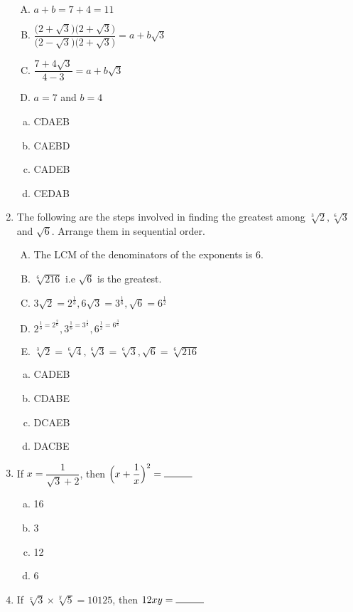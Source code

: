 \begin{multicols}{2}
\begin{enumerate}
\begin{enumerate}[(A)]
\item $a+b = 7+4 = 11$
\item $\dfrac{\Big(2+\sqrt{3}\Big)\Big(2+\sqrt{3}\Big)}{\Big(2-\sqrt{3}\Big)\Big(2+\sqrt{3}\Big)} = a+b\sqrt{3}$
\item $\dfrac{7+4\sqrt{3}}{4-3} = a+b\sqrt{3}$
\item $a =7$ and $b = 4$
\end{enumerate}
\begin{enumerate}[(a)]
\item CDAEB
\item CAEBD
\item CADEB
\item CEDAB
\end{enumerate}
\item The following are the steps involved in finding the greatest among $\sqrt[3]{2}, \sqrt[6]{3}$ and $\sqrt{6}$. Arrange them in sequential order.
\begin{enumerate}[(A)]
\item The LCM of the denominators of the exponents is 6.
\item $\sqrt[6]{216}$ i.e $\sqrt{6}$ is the greatest.
\item $3\sqrt{2} = 2^{\frac{1}{3}}, 6\sqrt{3} = 3^{\frac{1}{6}}, \sqrt{6} = 6^{\frac{1}{2}}$
\item $2^{\frac{1}{3} = 2^{\frac{2}{6}}}, 3^{\frac{1}{6} = 3^{\frac{1}{6}}}, 6^{\frac{1}{2} = 6^{\frac{3}{6}}}$
\item $\sqrt[3]{2} = \sqrt[6]{4}, \sqrt[6]{3} = \sqrt[6]{3}, \sqrt{6} = \sqrt[6]{216}$
\end{enumerate}
\begin{enumerate}[(a)]
\item CADEB
\item CDABE
\item DCAEB
\item DACBE
\end{enumerate}
\item If $x = \dfrac{1}{\sqrt{3}+2}$, then $\Big(x+\dfrac{1}{x}\Big)^2 = \rule{1cm}{0.15mm}$
\begin{multicols}{2}
\begin{enumerate}[(a)]
\item 16
\item 3
\item 12
\item 6
\end{enumerate}
\end{multicols}
\item If $\sqrt[x]{3} \times \sqrt[y]{5} = 10125$, then $12xy = \rule{1cm}{0.15mm}$

\end{enumerate}
\end{multicols}
